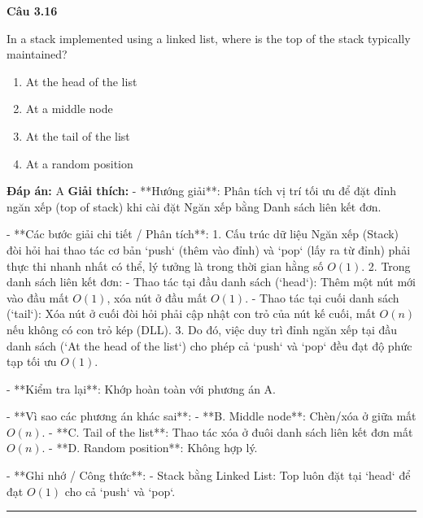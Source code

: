 \documentclass[11pt,a4paper]{article}
\newenvironment{question}[1]{%
  \par\vspace{1em}\noindent\textbf{\large Câu #1}\par\vspace{0.4em}
}{%
  \par\vspace{1em}\hrule\vspace{0.6em}
}
\newenvironment{choices}{%
  \begin{enumerate}[label=\textbf{\Alph*.},leftmargin=2.2em,itemsep=2pt,topsep=3pt]
}{%
  \end{enumerate}
}
\newcommand{\choice}{\item}
\begin{document}
\begin{question}{3.16}
In a stack implemented using a linked list, where is the top of the stack typically maintained?
\begin{choices}
\choice At the head of the list
\choice At a middle node
\choice At the tail of the list
\choice At a random position
\end{choices}
\textbf{Đáp án:} A
\textbf{Giải thích:} - **Hướng giải**:
  Phân tích vị trí tối ưu để đặt đỉnh ngăn xếp (top of stack) khi cài đặt Ngăn xếp bằng Danh sách liên kết đơn.

- **Các bước giải chi tiết / Phân tích**:
  1. Cấu trúc dữ liệu Ngăn xếp (Stack) đòi hỏi hai thao tác cơ bản `push` (thêm vào đỉnh) và `pop` (lấy ra từ đỉnh) phải thực thi nhanh nhất có thể, lý tưởng là trong thời gian hằng số \(O(1)\).
  2. Trong danh sách liên kết đơn:
     - Thao tác tại đầu danh sách (`head`): Thêm một nút mới vào đầu mất \(O(1)\), xóa nút ở đầu mất \(O(1)\).
     - Thao tác tại cuối danh sách (`tail`): Xóa nút ở cuối đòi hỏi phải cập nhật con trỏ của nút kế cuối, mất \(O(n)\) nếu không có con trỏ kép (DLL).
  3. Do đó, việc duy trì đỉnh ngăn xếp tại đầu danh sách (`At the head of the list`) cho phép cả `push` và `pop` đều đạt độ phức tạp tối ưu \(O(1)\).

- **Kiểm tra lại**:
  Khớp hoàn toàn với phương án A.

- **Vì sao các phương án khác sai**:
  - **B. Middle node**: Chèn/xóa ở giữa mất \(O(n)\).
  - **C. Tail of the list**: Thao tác xóa ở đuôi danh sách liên kết đơn mất \(O(n)\).
  - **D. Random position**: Không hợp lý.

- **Ghi nhớ / Công thức**:
  - Stack bằng Linked List: Top luôn đặt tại `head` để đạt \(O(1)\) cho cả `push` và `pop`.
\end{question}
\end{document}
